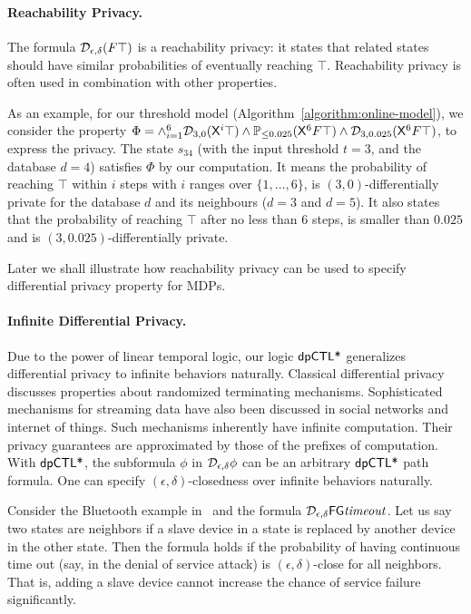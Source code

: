 \paragraph{Reachability Privacy.}
The formula $\mathcal{D}_{{\epsilon}, {\delta}}(F \top)$ is a reachability privacy: it states that related states should have similar probabilities of eventually reaching $\top$. Reachability privacy is often used in combination with other properties.

As an example, for our threshold model (Algorithm~\ref{algorithm:online-model}), we consider the property $\Phi=\wedge_{i=1}^{6} \mathcal{D}_{{3}, {0}}(\mathsf{X}^i \top) \wedge \mathbb{P}_{\le 0.025}(\mathsf{X}^6 F \top) \wedge \mathcal{D}_{{3}, {0.025}}(\mathsf{X}^6 F \top)$, to express the privacy. The state $s_{34}$ (with the input threshold $t=3$, and the database $d=4$) satisfies $\Phi$ by our computation. It means the probability of reaching $\top$  within $i$ steps with $i$ ranges over $\{1,\ldots,6\}$, is $(3, 0)$-differentially private for the database $d$ and its neighbours ($d=3$ and $d=5$). It also states that the probability of reaching $\top$ after no less than $6$ steps, is smaller than $0.025$ and is  $(3, 0.025)$-differentially private.

Later we shall illustrate how reachability privacy can be used to specify differential privacy property for MDPs.

\paragraph{Infinite Differential Privacy.}
Due to the power of linear temporal logic, our logic $\textsf{dpCTL*}$ generalizes differential privacy to infinite
behaviors naturally. Classical differential privacy discusses properties about
randomized terminating mechanisms. Sophisticated mechanisms for
streaming data have also been discussed in social networks and
internet of things. Such mechanisms inherently have infinite
computation. Their privacy guarantees are approximated by those of the
prefixes of computation.
With $\textsf{dpCTL*}$, the subformula $\phi$ in $\mathcal{D}_{{\epsilon}, {\delta}} \phi$
can be an arbitrary $\textsf{dpCTL*}$ path formula. One can specify
$(\epsilon, \delta)$-closedness over infinite behaviors naturally.

Consider the Bluetooth example in~\cite{DKNP04} and the
formula $\mathcal{D}_{{\epsilon}, {\delta}}{\mathsf{F} \mathsf{G} \mathit{timeout}}$. Let us say
two states are neighbors if a slave device in a state is replaced by
another device in the other state.
Then the formula holds if the probability of having
continuous time out (say, in the denial of service attack) is
$(\epsilon, \delta)$-close for all neighbors. That is, adding a slave
device cannot increase the chance of service failure significantly.


